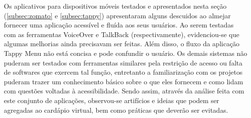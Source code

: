 Os aplicativos para dispositivos móveis testados e apresentados nesta seção (\ref{subsec:zomato} e \ref{subsec:tappy}) apresentaram alguns descuidos ao almejar fornecer uma aplicação acessível e fluída aos seus usuários. Ao serem testadas com as ferramentas VoiceOver e TalkBack (respectivamente), evidenciou-se que algumas melhorias ainda precisavam ser feitas. Além disso, o fluxo da aplicação Tappy Menu não está concisa e pode confundir o usuário. Os demais sistemas não puderam ser testados com ferramentas similares pela restrição de acesso ou falta de softwares que exercem tal função, entretanto a familiarização com os projetos puderam trazer um conhecimento básico sobre o que eles fornecem e como lidam com questões voltadas à acessibilidade. Sendo assim, através da análise feita com este conjunto de aplicações, observou-se artifícios e ideias que podem ser agregadas ao cardápio virtual, bem como práticas que deverão ser evitadas.